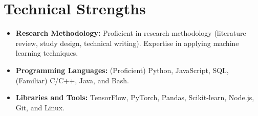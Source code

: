 \section{Technical Strengths}
\vspace{0.3cm}

\begin{itemize}[leftmargin=.2in]
\setlength\itemsep{.3em}
    \item \textbf{Research Methodology:} Proficient in research methodology (literature review, study design, technical writing). Expertise in applying machine learning techniques.
    
    \item \textbf{Programming Languages:} (Proficient) Python, JavaScript, SQL, (Familiar) C/C++, Java, and Bash.
    
    \item \textbf{Libraries and Tools:} TensorFlow, PyTorch, Pandas, Scikit-learn, Node.js, Git, and Linux.

\end{itemize}
